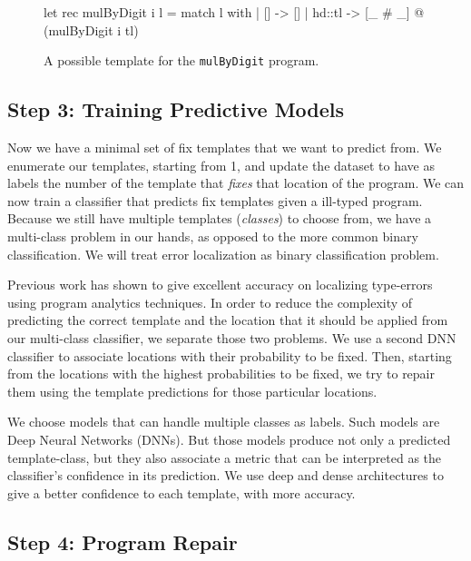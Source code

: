 \begin{figure}[ht]
  \begin{ecode}
    let rec mulByDigit i l =
      match l with
      | []     -> []
      | hd::tl -> [_ # _] @ (mulByDigit i tl)
  \end{ecode}
  \caption{A possible template for the \texttt{mulByDigit} program.}
  \label{fig:suggestion}
\end{figure}



\subsection{Step 3: Training Predictive Models}
\label{subsec:step3}

Now we have a minimal set of fix templates that we want to predict from. We enumerate our templates, starting from 1,
and update the dataset to have as labels the number of the template that \emph{fixes} that location of the program. We
can now train a classifier that predicts fix templates given a ill-typed program. Because we still have multiple
templates (\emph{classes}) to choose from, we have a multi-class problem in our hands, as opposed to the more common
binary classification. We will treat error localization as binary classification problem.

 Previous work has shown to give excellent accuracy on localizing type-errors using program
analytics techniques. In order to reduce the complexity of predicting the correct template and the location that it
should be applied from our multi-class classifier, we separate those two problems. We use a second DNN classifier to
associate locations with their probability to be fixed. Then, starting from the locations with the highest probabilities
to be fixed, we try to repair them using the template predictions for those particular locations.

 We choose models that can handle multiple classes as labels. Such models are Deep
Neural Networks (DNNs). But those models produce not only a predicted template-class, but they also associate a metric
that can be interpreted as the classifier’s confidence in its prediction. We use deep and dense architectures to give a
better confidence to each template, with more accuracy.



\subsection{Step 4: Program Repair}
\label{subsec:step4}


